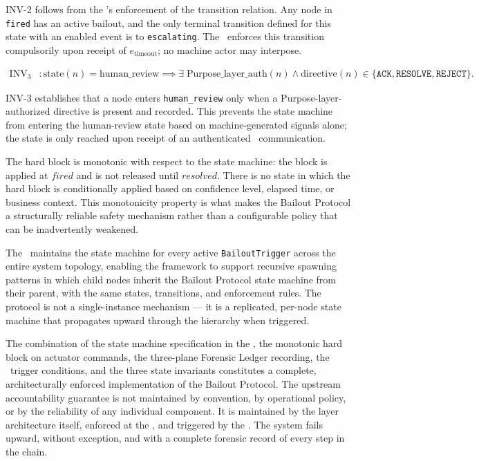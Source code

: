 INV-2 follows from the \fact's enforcement of the transition relation. Any node in \texttt{fired} has an active bailout, and the only terminal transition defined for this state with an enabled event is to \texttt{escalating}. The \fact\ enforces this transition compulsorily upon receipt of $e_{\mathrm{timeout}}$; no machine actor may interpose.

\begin{align}
\mathrm{INV}_3 &: \mathrm{state}(n) = \mathrm{human\_review} \implies \exists\; \mathrm{Purpose\_layer\_auth}(n) \land \mathrm{directive}(n) \in \{\texttt{ACK}, \texttt{RESOLVE}, \texttt{REJECT}\}. \tag{INV-3}
\end{align}

INV-3 establishes that a node enters \texttt{human\_review} only when a Purpose-layer-authorized directive is present and recorded. This prevents the state machine from entering the human-review state based on machine-generated signals alone; the state is only reached upon receipt of an authenticated \purpose\ communication.

The hard block is monotonic with respect to the state machine: the block is applied at $fired$ and is not released until $resolved$. There is no state in which the hard block is conditionally applied based on confidence level, elapsed time, or business context. This monotonicity property is what makes the Bailout Protocol a structurally reliable safety mechanism rather than a configurable policy that can be inadvertently weakened.

The \fact\ maintains the state machine for every active \texttt{BailoutTrigger} across the entire system topology, enabling the framework to support recursive spawning patterns in which child nodes inherit the Bailout Protocol state machine from their parent, with the same states, transitions, and enforcement rules. The protocol is not a single-instance mechanism --- it is a replicated, per-node state machine that propagates upward through the hierarchy when triggered.

The combination of the state machine specification in the \fact, the monotonic hard block on actuator commands, the three-plane Forensic Ledger recording, the \bounds\ trigger conditions, and the three state invariants constitutes a complete, architecturally enforced implementation of the Bailout Protocol. The upstream accountability guarantee is not maintained by convention, by operational policy, or by the reliability of any individual component. It is maintained by the layer architecture itself, enforced at the \fact, and triggered by the \bounds. The system fails upward, without exception, and with a complete forensic record of every step in the chain.
